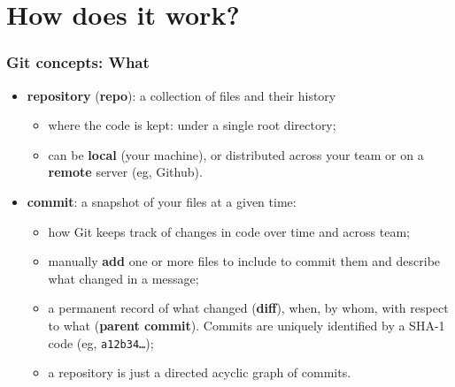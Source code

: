 \documentclass[10pt,svgnames,handout]{beamer}
\begin{document}
\section{How does it work?}
\begin{frame}
\frametitle{Git concepts: What}
    
\begin{itemize}[<+->]
\item \textbf{repository} (\textbf{repo}): a collection of files and their history
\begin{itemize}
   \item where the code is kept: under a single root directory;
   \item can be \textbf{local} (your machine), or distributed across your team or on a \textbf{remote} server (eg, Github).
 \end{itemize}

\item \textbf{commit}: a snapshot of your files at a given time:
\begin{itemize}
  \item how Git keeps track of changes in code over time and across team;
  \item manually \textbf{add} one or more files to include to commit them and describe what changed in a message;
  \item a permanent record of what changed (\textbf{diff}), when, by whom, with respect to what (\textbf{parent commit}). Commits are uniquely identified by a SHA-1 code (eg, \texttt{a12b34\ldots});
  \item a repository is just a directed acyclic graph of commits.
\end{itemize}
\end{itemize}
\end{frame}
\end{document}
